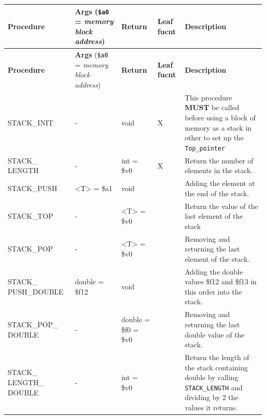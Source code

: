     \begin{longtable}{|m{3cm}|m{3cm}|m{2cm}|m{1cm}|m{5.1cm}|}
        \hline
            \textbf{Procedure} & 
            \textbf{Args} \newline (\texttt{\$a0} = \textit{memory block address}) & 
            \textbf{Return} & 
            \centering \textbf{Leaf fucnt} &
            \textbf{Description}\\
        \hline
        \endfirsthead
        \hline
            \textbf{Procedure} & 
            \textbf{Args} \newline (\texttt{\$a0} = \textit{memory block address}) & 
            \textbf{Return} & 
            \centering \textbf{Leaf fucnt} &
            \textbf{Description}\\
        \hline
        \endhead
            STACK\_INIT& 
            \centering -&
            void&
            \centering X&
            This procedure \textbf{MUST} be called before using a block of memory as a stack in other to set up the \texttt{Top\_pointer}\\
        \hline
            STACK\_ LENGTH& 
            \centering -&
            int = \$v0&
            \centering X&
            Return the number of elements in the stack.\\
        \hline
            STACK\_PUSH& 
            <T> = \$a1&
            void&
            &
            Adding the element at the end of the stack.\\
        \hline
            STACK\_TOP& 
            \centering -&
            <T> = \$v0&
            &
            Return the value of the last element of the stack\\
        \hline
            STACK\_POP& 
            \centering -&
            <T> = \$v0&
            &
            Removing and returning the last element of the stack.\\
        \hline
            STACK\_ PUSH\_DOUBLE& 
            double = \$f12&
            void&
            &
            Adding the double values \$f12 and \$f13 in this order into the stack.\\
        \hline
            STACK\_POP\_ DOUBLE& 
            \centering -&
            double = \$f0 = \$v0&
            &
            Removing and returning the last double value of the stack.\\
        \hline
            STACK\_ LENGTH\_ DOUBLE& 
            \centering -&
            int = \$v0&
            &
            Return the length of the stack containing double by calling \texttt{STACK\_LENGTH} and dividing by 2 the values it returns.\\

\end{longtable}
